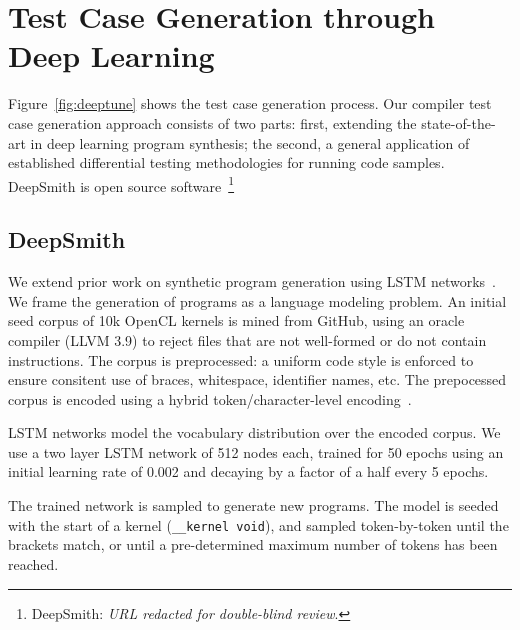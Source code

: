 \section{Test Case Generation through Deep Learning}

Figure~\ref{fig:deeptune} shows the test case generation process. Our compiler test case generation approach consists of two parts: first, extending the state-of-the-art in deep learning program synthesis; the second, a general application of established differential testing methodologies for running code samples. DeepSmith is open source software~\footnote{DeepSmith: \emph{URL redacted for double-blind review}.}


\subsection{DeepSmith}

We extend prior work on synthetic program generation using LSTM networks~\cite{Cummins2017a}. We frame the generation of programs as a language modeling problem. An initial seed corpus of 10k OpenCL kernels is mined from GitHub, using an oracle compiler (LLVM 3.9) to reject files that are not well-formed or do not contain instructions. The corpus is preprocessed: a uniform code style is enforced to ensure consitent use of braces, whitespace, identifier names, etc. The prepocessed corpus is encoded using a hybrid token/character-level encoding~\cite{Cummins2017b}. 

LSTM networks model the vocabulary distribution over the encoded corpus. We use a two layer LSTM network of 512 nodes each, trained for 50 epochs using an initial learning rate of 0.002 and decaying by a factor of a half every 5 epochs.

The trained network is sampled to generate new programs. The model is seeded with the start of a kernel (\texttt{\_\_kernel void}), and sampled token-by-token until the brackets match, or until a pre-determined maximum number of tokens has been reached.


